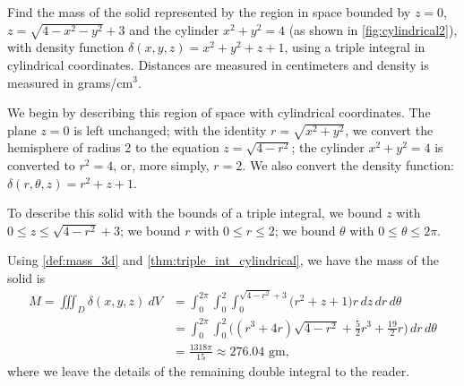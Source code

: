 {Find the mass of the solid represented by the region in space bounded by $z=0$, $z=\sqrt{4-x^2-y^2}+3$ and the cylinder $x^2+y^2=4$ (as shown in \autoref{fig:cylindrical2}), with density function $\delta(x,y,z) = x^2+y^2+z+1$, using a triple integral in cylindrical coordinates. Distances are measured in centimeters and density is measured in grams/cm$^3$.}
{We begin by describing this region of space with cylindrical coordinates. The plane $z=0$ is left unchanged; with the identity $r=\sqrt{x^2+y^2}$, we convert the hemisphere of radius 2 to the equation $z=\sqrt{4-r^2}$; the cylinder $x^2+y^2=4$ is converted to $r^2=4$, or, more simply, $r=2$.  We also convert the density function: $\delta(r,\theta,z) = r^2+z+1$.

To describe this solid with the bounds of a triple integral, we bound $z$ with $0\leq z\leq \sqrt{4-r^2}+3$; we bound $r$ with $0 \leq r \leq 2$; we bound $\theta$ with $0 \leq \theta \leq 2\pi$.

Using \autoref{def:mass_3d} and \autoref{thm:triple_int_cylindrical}, we have the mass of the solid is
\begin{align*}
M=\iiint_D\delta(x,y,z)\ dV &= \int_0^{2\pi}\int_0^2\int_0^{\sqrt{4-r^2}+3}\big(r^2+z+1\big)r\,dz\,dr\,d\theta \\
&= \int_0^{2\pi}\int_0^2\big((r^3+4r)\sqrt{4-r^2}+\frac52r^3+\frac{19}2r\big)\,dr\,d\theta \\
&= \frac{1318\pi}{15} \approx 276.04\text{ gm},
\end{align*}
where we leave the details of the remaining double integral to the reader.}


